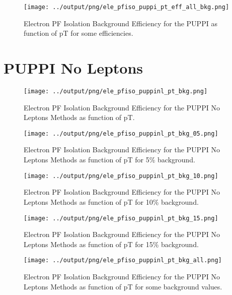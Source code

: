 \documentclass[11pt]{book}
\begin{document}
\begin{figure}[htb]
\centering
\texttt{[image: ../output/png/ele\_pfiso\_puppi\_pt\_eff\_all\_bkg.png]}
\caption{Electron PF Isolation Background Efficiency for the PUPPI as function of pT for some efficiencies.}
\label{fig:ele_pfiso_pt_eff_puppi_eff_all_bkg}
\end{figure}
\clearpage

\section{PUPPI No Leptons}
\begin{figure}[htb]
\centering
\texttt{[image: ../output/png/ele\_pfiso\_puppinl\_pt\_bkg.png]}
\caption{Electron PF Isolation Background Efficiency for the PUPPI No Leptons Methods as function of pT.}
\label{fig:ele_pfiso_pt_bkg_puppinl}
\end{figure}

\begin{figure}[htb]
\centering
\texttt{[image: ../output/png/ele\_pfiso\_puppinl\_pt\_bkg\_05.png]}
\caption{Electron PF Isolation Background Efficiency for the PUPPI No Leptons Methods as function of pT for 5\% background.}
\label{fig:ele_pfiso_pt_bkg_puppinl_bkg_05}
\end{figure}

\begin{figure}[htb]
\centering
\texttt{[image: ../output/png/ele\_pfiso\_puppinl\_pt\_bkg\_10.png]}
\caption{Electron PF Isolation Background Efficiency for the PUPPI No Leptons Methods as function of pT for 10\% background.}
\label{fig:ele_pfiso_pt_bkg_puppinl_bkg_10}
\end{figure}

\begin{figure}[htb]
\centering
\texttt{[image: ../output/png/ele\_pfiso\_puppinl\_pt\_bkg\_15.png]}
\caption{Electron PF Isolation Background Efficiency for the PUPPI No Leptons Methods as function of pT for 15\% background.}
\label{fig:ele_pfiso_pt_bkg_puppinl_bkg_15}
\end{figure}

\begin{figure}[htb]
\centering
\texttt{[image: ../output/png/ele\_pfiso\_puppinl\_pt\_bkg\_all.png]}
\caption{Electron PF Isolation Background Efficiency for the PUPPI No Leptons Methods as function of pT for some background values.}
\label{fig:ele_pfiso_pt_bkg_puppinl_bkg_all}
\end{figure}
\end{document}
